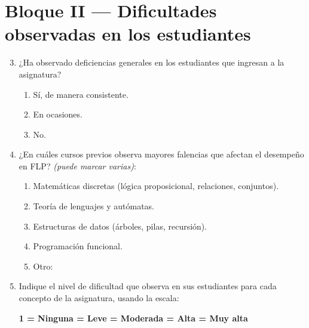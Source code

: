 \section*{Bloque II — Dificultades observadas en los estudiantes}

\begin{enumerate}
    \setcounter{enumi}{2}

    \item ¿Ha observado deficiencias generales en los estudiantes que ingresan a la asignatura?
    \begin{enumerate}
        \item Sí, de manera consistente.
        \item En ocasiones.
        \item No.
    \end{enumerate}

    \item ¿En cuáles cursos previos observa mayores falencias que afectan el desempeño en FLP? \textit{(puede marcar varias)}:
    \begin{enumerate}
        \item Matemáticas discretas (lógica proposicional, relaciones, conjuntos).
        \item Teoría de lenguajes y autómatas.
        \item Estructuras de datos (árboles, pilas, recursión).
        \item Programación funcional.
        \item Otro: \underline{\hspace{6cm}}
    \end{enumerate}

    \item Indique el nivel de dificultad que observa en sus estudiantes para cada concepto de la asignatura, usando la escala:

    \begin{center}
    \textbf{1 = Ninguna  = Leve  = Moderada  = Alta  = Muy alta}
    \end{center}


\end{enumerate}
